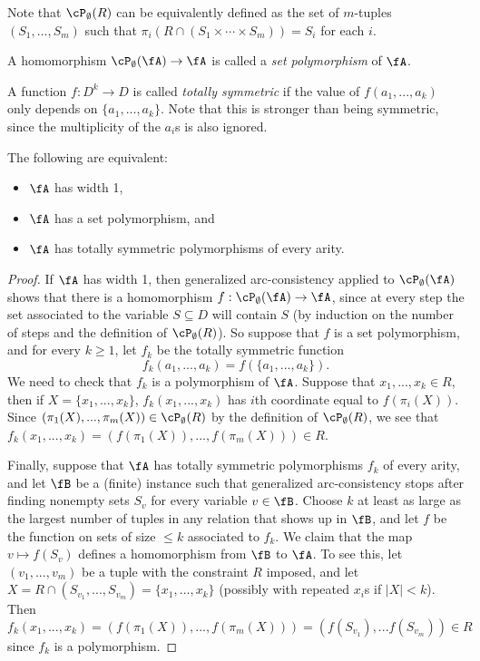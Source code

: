Note that $\cP_\emptyset(R)$ can be equivalently defined as the set of $m$-tuples $(S_1, ..., S_m)$ such that $\pi_i(R \cap (S_1 \times \cdots \times S_m)) = S_i$ for each $i$.

\begin{defn} A homomorphism $\cP_\emptyset(\fA) \rightarrow \fA$ is called a \emph{set polymorphism} of $\fA$.
\end{defn}

\begin{defn} A function $f : D^k \rightarrow D$ is called \emph{totally symmetric} if the value of $f(a_1, ..., a_k)$ only depends on $\{a_1, ..., a_k\}$. Note that this is stronger than being symmetric, since the multiplicity of the $a_i$s is also ignored.
\end{defn}

\begin{thm} The following are equivalent:
\begin{itemize}
\item $\fA$ has width 1,

\item $\fA$ has a set polymorphism, and

\item $\fA$ has totally symmetric polymorphisms of every arity.
\end{itemize}
\end{thm}
\begin{proof} If $\fA$ has width 1, then generalized arc-consistency applied to $\cP_\emptyset(\fA)$ shows that there is a homomorphism $f: \cP_\emptyset(\fA) \rightarrow \fA$, since at every step the set associated to the variable $S \subseteq D$ will contain $S$ (by induction on the number of steps and the definition of $\cP_\emptyset(R)$). So suppose that $f$ is a set polymorphism, and for every $k \ge 1$, let $f_k$ be the totally symmetric function
\[
f_k(a_1, ..., a_k) = f(\{a_1, ..., a_k\}).
\]
We need to check that $f_k$ is a polymorphism of $\fA$. Suppose that $x_1, ..., x_k \in R$, then if $X = \{x_1, ..., x_k\}$, $f_k(x_1, ..., x_k)$ has $i$th coordinate equal to $f(\pi_i(X))$. Since $(\pi_1(X), ..., \pi_m(X)) \in \cP_\emptyset(R)$ by the definition of $\cP_\emptyset(R)$, we see that $f_k(x_1, ..., x_k) = (f(\pi_1(X)), ..., f(\pi_m(X))) \in R$.

Finally, suppose that $\fA$ has totally symmetric polymorphisms $f_k$ of every arity, and let $\fB$ be a (finite) instance such that generalized arc-consistency stops after finding nonempty sets $S_v$ for every variable $v \in \fB$. Choose $k$ at least as large as the largest number of tuples in any relation that shows up in $\fB$, and let $f$ be the function on sets of size $\le k$ associated to $f_k$. We claim that the map $v \mapsto f(S_v)$ defines a homomorphism from $\fB$ to $\fA$. To see this, let $(v_1, ..., v_m)$ be a tuple with the constraint $R$ imposed, and let $X = R \cap (S_{v_1}, ..., S_{v_m}) = \{x_1, ..., x_k\}$ (possibly with repeated $x_i$s if $|X| < k$). Then $f_k(x_1, ..., x_k) = (f(\pi_1(X)), ..., f(\pi_m(X))) = (f(S_{v_1}), ... f(S_{v_m})) \in R$ since $f_k$ is a polymorphism.
\end{proof}

